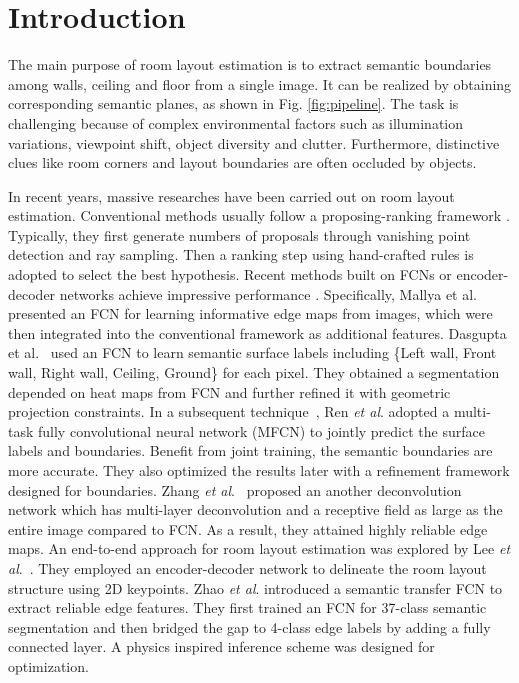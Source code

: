 \section{Introduction}
\label{sec:intro}

The main purpose of room layout estimation is to extract semantic boundaries among walls, ceiling and floor from a single image. It can be realized by obtaining corresponding semantic planes, as shown in Fig. \ref{fig:pipeline}. The task is challenging because of complex environmental factors such as illumination variations, viewpoint shift, object diversity and clutter. Furthermore, distinctive clues like room corners and layout boundaries are often occluded by objects. 

In recent years, massive researches have been carried out on room layout estimation. Conventional methods usually follow a proposing-ranking framework \cite{hedau2009recovering,wang2013discriminative,gupta2010estimating,hedau2010thinking}. Typically, they first generate numbers of proposals through vanishing point detection and ray sampling. Then a ranking step using hand-crafted rules is adopted to select the best hypothesis. Recent methods built on FCNs \cite{long2015fully} or encoder-decoder networks achieve impressive performance \cite{mallya2015learning,ren2016coarse,zhang2017learning,dasgupta2016delay,LeeRoomNet17,zhao2017physics}. Specifically, 
%
Mallya et al.~\cite{mallya2015learning} presented an FCN for learning informative edge maps from images, which were then integrated into the conventional framework as additional features. 
%
Dasgupta et al.~\cite{dasgupta2016delay} used an FCN to learn semantic surface labels including \{Left wall, Front wall, Right wall, Ceiling, Ground\} for each pixel. They obtained a segmentation depended on heat maps from FCN and further refined it with geometric projection constraints.
% 
In a subsequent technique~\cite{ren2016coarse}, Ren \emph{et al}. adopted a multi-task fully convolutional neural network (MFCN) to jointly predict the surface labels and boundaries. Benefit from joint training, the semantic boundaries are more accurate. They also optimized the results later with a refinement framework designed for boundaries.
% 
Zhang \emph{et al}.~\cite{zhang2017learning} proposed an another deconvolution network which has multi-layer deconvolution and a receptive field as large as the entire image compared to FCN. As a result, they attained highly reliable edge maps. 
%
An end-to-end approach for room layout estimation was explored by Lee \emph{et al}.~\cite{LeeRoomNet17}. They employed an encoder-decoder network to delineate the room layout structure using 2D keypoints.
%
Zhao \emph{et al}. \cite{zhao2017physics} introduced a semantic transfer FCN to extract reliable edge features. They first trained an FCN for 37-class semantic segmentation and then bridged the gap to 4-class edge labels by adding a fully connected layer. A physics inspired inference scheme was designed for optimization.


